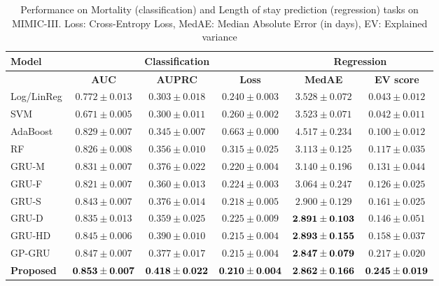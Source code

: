 \documentclass{article} \usepackage{iclr2019_conference,times}
\begin{document}
\begin{table}[h]
\caption{Performance on Mortality (classification) and Length of stay prediction (regression) tasks on MIMIC-III. Loss: Cross-Entropy Loss, MedAE: Median Absolute Error (in days), EV: Explained variance}
\footnotesize
\begin{center}
\begin{tabular}{ l c c c c c} 
 \toprule
 {\bf Model}&  \multicolumn{3}{c}{\bf Classification} &  \multicolumn{2}{c}{\bf Regression}\\
 \midrule
 {} & {\bf AUC} & {\bf AUPRC} & {\bf Loss} & {\bf MedAE} & {\bf EV score}\\
  \midrule
 {Log/LinReg} & $0.772\pm 0.013$ & $0.303\pm0.018$  & $0.240\pm 0.003$  & $3.528\pm0.072$&	$0.043\pm0.012$\\ 
  {SVM} & $0.671\pm 0.005$ & $0.300\pm0.011$& $0.260\pm 0.002$&	$3.523\pm0.071$&	$0.042\pm0.011$\\ 
 
  AdaBoost & $0.829\pm0.007$& $0.345\pm0.007$	&$0.663\pm0.000$ &	$4.517\pm0.234$& 	$0.100\pm0.012$\\ 
 
  RF & $0.826\pm 0.008$ &	$0.356\pm0.010$&	$0.315\pm0.025$ &	$3.113\pm0.125$&	$0.117\pm0.035$  \\ 
 
  GRU-M & $0.831\pm0.007$ & 	$0.376\pm0.022$&	$0.220\pm0.004$ &	$3.140\pm0.196$&	$0.131\pm0.044$\\ 
 
 GRU-F & $0.821\pm0.007$ &  $0.360\pm0.013$&		 $0.224\pm0.003$&	$3.064\pm0.247$& 	$0.126\pm0.025$ \\
 
  GRU-S & $0.843\pm0.007$ & 	$0.376\pm0.014$ &		$0.218\pm0.005$  &	$2.900\pm0.129$&	$0.161\pm0.025$\\ 

 GRU-D & $0.835\pm0.013$ & 	$0.359\pm0.025$&	$0.225\pm0.009$ &  ${\bf 2.891\pm0.103}$&	$0.146\pm0.051$\\
 GRU-HD & $0.845\pm0.006$ & $0.390\pm0.010$ & $0.215\pm0.004$ & ${\bf 2.893\pm0.155}$ &	$0.158\pm0.037$ \\ 
GP-GRU & $0.847 \pm 0.007$ & $0.377 \pm 0.017$ & $0.215 \pm 0.004$ & ${\bf 2.847 \pm 0.079}$ &  $0.217 \pm 0.020$\\
 {\bf Proposed } &  ${\bf 0.853\pm 0.007 }$ &	${\bf 0.418\pm0.022}$&	 ${\bf 0.210 \pm 0.004}$  & ${\bf 2.862\pm0.166}$ & ${\bf 0.245\pm0.019}$\\ 
\bottomrule
 \end{tabular}
\end{center}
\label{table:1}
\end{table} 
\end{document}
